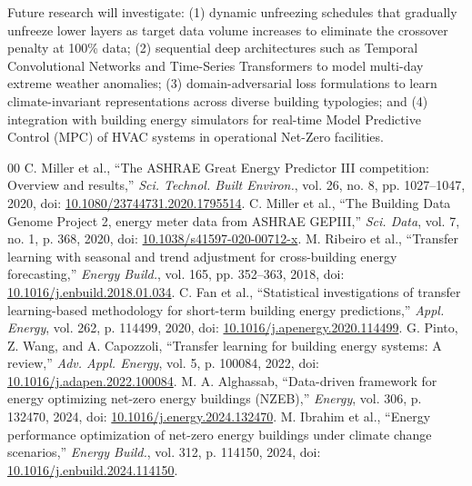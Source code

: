 \documentclass[conference]{IEEEtran}
\begin{document}
Future research will investigate: (1) dynamic unfreezing schedules that gradually unfreeze lower layers as target data volume increases to eliminate the crossover penalty at 100\% data; (2) sequential deep architectures such as Temporal Convolutional Networks and Time-Series Transformers to model multi-day extreme weather anomalies; (3) domain-adversarial loss formulations to learn climate-invariant representations across diverse building typologies; and (4) integration with building energy simulators for real-time Model Predictive Control (MPC) of HVAC systems in operational Net-Zero facilities.


\clearpage
\begin{thebibliography}{00}
\setlength{\itemsep}{1.2pt plus 0.5pt minus 0.5pt}
\setlength{\parskip}{0pt}
\small
{} C. Miller et al., ``The ASHRAE Great Energy Predictor III competition: Overview and results,'' \textit{Sci. Technol. Built Environ.}, vol. 26, no. 8, pp. 1027--1047, 2020, doi: \href{https://doi.org/10.1080/23744731.2020.1795514}{10.1080/23744731.2020.1795514}.
 C. Miller et al., ``The Building Data Genome Project 2, energy meter data from ASHRAE GEPIII,'' \textit{Sci. Data}, vol. 7, no. 1, p. 368, 2020, doi: \href{https://doi.org/10.1038/s41597-020-00712-x}{10.1038/s41597-020-00712-x}.
 M. Ribeiro et al., ``Transfer learning with seasonal and trend adjustment for cross-building energy forecasting,'' \textit{Energy Build.}, vol. 165, pp. 352--363, 2018, doi: \href{https://doi.org/10.1016/j.enbuild.2018.01.034}{10.1016/j.enbuild.2018.01.034}.
 C. Fan et al., ``Statistical investigations of transfer learning-based methodology for short-term building energy predictions,'' \textit{Appl. Energy}, vol. 262, p. 114499, 2020, doi: \href{https://doi.org/10.1016/j.apenergy.2020.114499}{10.1016/j.apenergy.2020.114499}.
 G. Pinto, Z. Wang, and A. Capozzoli, ``Transfer learning for building energy systems: A review,'' \textit{Adv. Appl. Energy}, vol. 5, p. 100084, 2022, doi: \href{https://doi.org/10.1016/j.adapen.2022.100084}{10.1016/j.adapen.2022.100084}.
 M. A. Alghassab, ``Data-driven framework for energy optimizing net-zero energy buildings (NZEB),'' \textit{Energy}, vol. 306, p. 132470, 2024, doi: \href{https://doi.org/10.1016/j.energy.2024.132470}{10.1016/j.energy.2024.132470}.
 M. Ibrahim et al., ``Energy performance optimization of net-zero energy buildings under climate change scenarios,'' \textit{Energy Build.}, vol. 312, p. 114150, 2024, doi: \href{https://doi.org/10.1016/j.enbuild.2024.114150}{10.1016/j.enbuild.2024.114150}.

\end{thebibliography}
\end{document}
